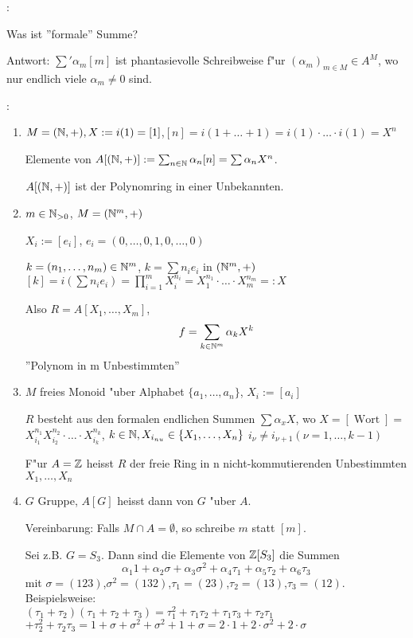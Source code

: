 :{Was ist ''formale'' Summe?

 Antwort: $\sum ' \alpha_m[m]$ ist phantasievolle Schreibweise f"ur $(\alpha_m)_{m\in M}\in A^M$,
 wo nur endlich viele $\alpha_m \neq 0$ sind.
}
\example{}:{
 \begin{enumerate}
 \item $M=(\mathbb N,+), X:=i(1)=[1]$,$[n]=i(1+ \ldots +1)=i(1)\cdot \ldots \cdot i(1)=X^n$

 Elemente von $A[(\mathbb N,+)]:= \sum_{n\in \mathbb N} \alpha_n[n]=\sum \alpha_n X^n$.

 $A[(\mathbb N,+)]$ ist der Polynomring in einer Unbekannten.
 \item $m\in \mathbb N_{>0}$, $M=(\mathbb N^m,+)$
 
 $X_i:=[e_i]$, $e_i=(0,\ldots,0,1,0,\ldots,0)$
 
 $k=(n_1,\ldots,n_m)\in \mathbb N^m$, $k=\sum n_ie_i$ in $(\mathbb N^m,+)$\\
 $[k]=i(\sum n_ie_i)= \prod_{i=1}^{m}X_i^{n_i}=X_1^{n_1}\cdot \ldots \cdot X_m^{n_m}=:X$
 
 Also $R=A[X_1,\ldots,X_m]$, 
 \[f=\sum_{k\in \mathbb N^m} \alpha_k X^k\]
 ''Polynom in m Unbestimmten''
 \item $M$ freies Monoid "uber Alphabet $\{a_1,\ldots,a_n\}$, $X_i:=[a_i]$
 
 $R$ besteht aus den formalen endlichen Summen $\sum \alpha_x X$, wo $X=[\operatorname{Wort}]=$
 $X_{i_1}^{n_1}X_{i_2}^{n_2}\cdot \ldots \cdot X_{i_k}^{n_k}$, $k\in \mathbb N, X_{i_{\\nu}}\in \{X_1,\ldots,X_n\}$
 $i_{\nu}\neq i_{\nu + 1} (\nu = 1, \ldots, k-1)$
 
 F"ur $A=\mathbb Z$ heisst $R$ der freie Ring in n nicht-kommutierenden Unbestimmten $X_1, \ldots, X_n$
 \item $G$ Gruppe, $A[G]$ heisst dann  von $G$ "uber $A$.
 
 Vereinbarung: Falls $M\cap A=\emptyset$, so schreibe $m$ statt $[m]$. 
 
 Sei z.B. $G=S_3$.
 Dann sind die Elemente von $\mathbb Z[S_3]$ die Summen 
 \[\alpha_1 1+\alpha_2\sigma+\alpha_3\sigma^2+\alpha_4 \tau_1 +\alpha_5 \tau_2+\alpha_6 \tau_3\]
 mit $\sigma = (123)$,$\sigma^2=(132)$,$\tau_1=(23)$,$ \tau_2=(13)$,$ \tau_3=(12)$.\\
 Beispielsweise:\\ 
 $(\tau_1+\tau_2)(\tau_1+\tau_2+\tau_3)=\tau_1^2+\tau_1\tau_2+\tau_1\tau_3+\tau_2\tau_1$
 $+\tau_2^2+\tau_2\tau_3=1+\sigma+\sigma^2+\sigma^2+1+\sigma=2\cdot 1+2\cdot\sigma^2+2\cdot\sigma$
 \end{enumerate} 
}

